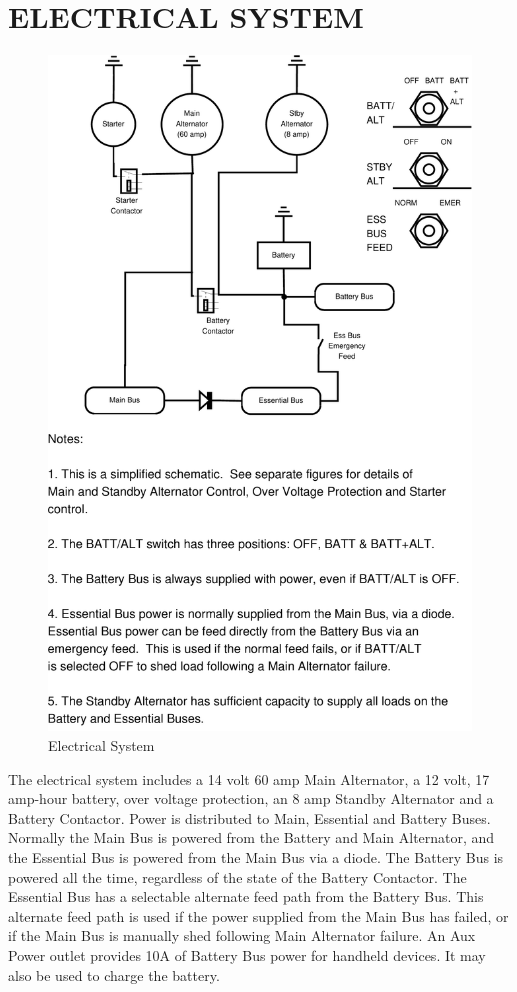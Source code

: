 \section{ELECTRICAL SYSTEM} 
\begin{figure} 
\includegraphics[clip,scale=0.4]{../Diagrams/Electrical_system_large_note} \caption{Electrical System} 
\end{figure}

The electrical system includes a 14 volt 60 amp Main Alternator, a 12 volt, 17 amp-hour battery, over voltage protection, an 8 amp Standby Alternator and a Battery Contactor. Power is distributed to Main, Essential and Battery Buses. Normally the Main Bus is powered from the Battery and Main Alternator, and the Essential Bus is powered from the Main Bus via a diode. The Battery Bus is powered all the time, regardless of the state of the Battery Contactor. The Essential Bus has a selectable alternate feed path from the Battery Bus. This alternate feed path is used if the power supplied from the Main Bus has failed, or if the Main Bus is manually shed following Main Alternator failure. An Aux Power outlet provides 10A of Battery Bus power for handheld devices. It may also be used to charge the battery.

